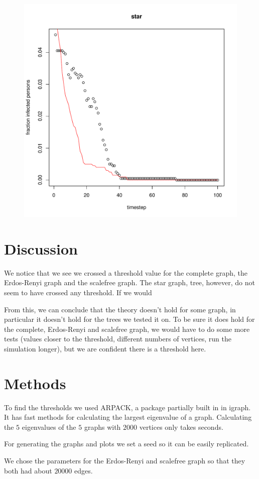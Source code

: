 \documentclass[paper=a4, fontsize=11pt]{scrartcl} %
\begin{document}
\begin{figure}[htbp] %
   \centering
   \includegraphics[width=\textwidth]{thresholdSimulation_star} 
   \label{star}
\end{figure}

\section{Discussion}
We notice that we see we crossed a threshold value for the complete graph, the Erdos-Renyi graph and the scalefree graph. The star graph, tree, however, do not seem to have crossed any threshold. If we would 

From this, we can conclude that the theory doesn't hold for some graph, in particular it doesn't hold for the trees we tested it on. To be sure it does hold for the complete, Erdos-Renyi and scalefree graph, we would have to do some more tests (values closer to the threshold, different numbers of vertices, run the simulation longer), but we are confident there is a threshold here.

\section{Methods}
To find the thresholds we used ARPACK, a package partially built in in igraph. It has fast methods for calculating the largest eigenvalue of a graph. Calculating the $5$ eigenvalues of the $5$ graphs with $2000$ vertices only takes seconds.

For generating the graphs and plots we set a seed so it can be easily replicated.

We chose the parameters for the Erdos-Renyi and scalefree graph so that they both had about $20000$ edges.
\end{document}
